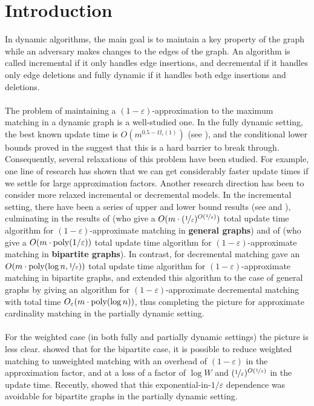 \documentclass[a4paper,11pt]{article}
\newcommand{\poly}{\mbox{\rm poly}}
\newcommand{\eps}{\varepsilon}
\theoremstyle{definition}
\theoremstyle{definition}
\theoremstyle{definition}
\theoremstyle{definition}
\theoremstyle{definition}
\theoremstyle{definition}
\theoremstyle{definition}
\theoremstyle{definition}
\theoremstyle{definition}
\theoremstyle{definition}
\theoremstyle{definition}
\theoremstyle{definition}
\theoremstyle{definition}
\theoremstyle{definition}
\theoremstyle{definition}
\begin{document}
\section{Introduction}

In dynamic algorithms, the main goal is to maintain a key property of the graph while an adversary makes changes to the edges of the graph. An algorithm is called incremental if it only handles edge insertions, and decremental if it handles only edge deletions and fully dynamic if it handles both edge insertions and deletions. \\ \\
The problem of maintaining a $(1-\eps)$-approximation to the maximum matching in a dynamic graph is a well-studied one. In the fully dynamic setting, the best known update time is $O(m^{0.5-\Omega_{\eps}(1)})$ (see \cite{BKS23}), and the conditional lower bounds proved in the \cite{HKNS15,KPP16} suggest that this is a hard barrier to break through. Consequently, several relaxations of this problem have been studied. For example, one line of research has shown that we can get considerably faster update times if we settle for large approximation factors. Another research direction has been to consider more relaxed incremental or decremental models. In the incremental setting, there have been a series of upper and lower bound results (see \cite{Dahlgaard16} and \cite{Gupta2014}), culminating in the results of \cite{GLSSS19} (who give a $O(m\cdot (\nicefrac{1}{\eps})^{O(\nicefrac{1}{\eps})})$ total update time algorithm for $(1-\eps)$-approximate matching in \textbf{general graphs}) and of \cite{BlikstadK23} (who give a $O(m\cdot \poly(1/\eps))$ total update time algorithm for $(1-\eps)$-approximate matching in \textbf{bipartite graphs}). In contrast, for decremental matching \cite{BPT20,JambulapatiJST22} gave an $O(m\cdot\poly(\log n,\nicefrac{1}{\eps}))$ total update time algorithm for $(1-\eps)$-approximate matching in bipartite graphs, and \cite{AssadiBD22} extended this algorithm to the case of general graphs by giving an algorithm for $(1-\eps)$-approximate decremental matching with total time $O_{\eps}(m\cdot \poly(\log n))$, thus completing the picture for approximate cardinality matching in the partially dynamic setting. \\ \\
For the weighted case (in both fully and partially dynamic settings) the picture is less clear. \cite{BernsteinDL21} showed that for the bipartite case, it is possible to reduce weighted matching to unweighted matching with an overhead of $(1-\eps)$ in the approximation factor, and at a loss of a factor of $\log W$ and $(\nicefrac{1}{\eps})^{O(\nicefrac{1}{\eps})}$ in the update time. Recently, \cite{BhattacharyaKS23b} showed that this exponential-in-$1/\eps$ dependence was avoidable for bipartite graphs in the partially dynamic setting. \\ \\
\end{document}
